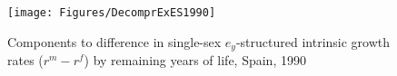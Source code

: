  \begin{figure}
                \centering
                \caption{Components to difference in single-sex
                $e_y$-structured intrinsic growth rates ($r^m - r^f$) by
                remaining years of life, Spain, 1990}
                \texttt{[image: Figures/DecomprExES1990]}
                \label{fig:exDecompr1990ES}
\end{figure}
        
 \FloatBarrier























